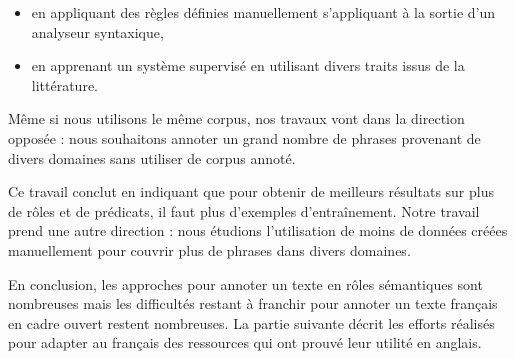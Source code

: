 \begin{itemize}
    \item en appliquant des règles définies manuellement s'appliquant à la
        sortie d'un analyseur syntaxique,
    \item en apprenant un système supervisé en utilisant divers traits issus de
        la littérature.
\end{itemize}

Même si nous utilisons le même corpus, nos travaux vont dans la direction
opposée : nous souhaitons annoter un grand nombre de phrases provenant de
divers domaines sans utiliser de corpus annoté.

Ce travail conclut en indiquant que pour obtenir de meilleurs résultats sur
plus de rôles et de prédicats, il faut plus d'exemples d'entraînement. Notre
travail prend une autre direction : nous étudions l'utilisation de moins de
données créées manuellement pour couvrir plus de phrases dans divers domaines.

En conclusion, les approches pour annoter un texte en rôles sémantiques sont
nombreuses mais les difficultés restant à franchir pour annoter un texte
français en cadre ouvert restent nombreuses. La partie suivante décrit les
efforts réalisés pour adapter au français des ressources qui ont prouvé leur
utilité en anglais.
